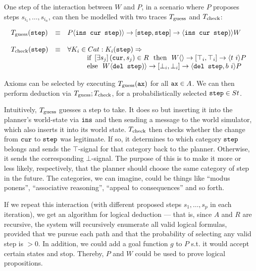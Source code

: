 One step of the interaction between $W$ and $P$, in a scenario where $P$ proposes steps $s_{i_1},\dots,s_{i_n}$, can then be modelled with two traces $T_{\mt{guess}}$ and $T_{\mt{check}}$:

$$
	\begin{array}{l l l}
		T_{\mt{guess}}(\tt{step}) & \equiv & \sendsf{P}{\tt{ins cur step})}{\tt{step}}{\tt{step}}{\tt{ins cur step})}{W}\\
		\\
		T_{\mt{check}}(\tt{step}) & \equiv &
		\forall K_i \in Cat: K_i(\tt{step}) \Rightarrow\\
		
		& & \hspace{1cm} \mt{if } \exQ{s_j} (\field{cur}, s_j) \in R\ \mt{ then } \
					\sendsf{W}{}{\top_i}{\top_i}{t\ i}{P}\\
		& & \hspace{1cm} \mt{else }\ \sendsf{W}{\tt{del step})}{\bot_i}{\bot_i}{\tt{del step}, b\ i}{P}\\
	\end{array}
$$

\medskip

Axioms can be selected by executing $T_{\mt{guess}}(\tt{ax})$ for all $\tt{ax} \in A$. We can then perform deduction via $T_{\mt{guess}};T_{\mt{check}}$, for a probabilistically selected $\tt{step} \in St$.

Intuitively, $T_{\mt{guess}}$ guesses a step to take. It does so but inserting it into the planner's world-state via $\tt{ins}$ and then sending a message to the world simulator, which also inserts it into its world state. $T_{\mt{check}}$ then checks whether the change from $\tt{cur}$ to $\tt{step}$ was legitimate. If so, it determines to which category $\tt{step}$ belongs and sends the $\top$-signal for that category back to the planner. Otherwise, it sends the corresponding $\bot$-signal. The purpose of this is to make it more or less likely, respectively, that the planner should choose the same category of step in the future. The categories, we can imagine, could be things like ``modus ponens'', ``associative reasoning'', ``appeal to consequences'' and so forth.

If we repeat this interaction (with different proposed steps $s_1,\dots,s_p$ in each iteration), we get an algorithm for logical deduction  --- that is, since $A$ and $R$ are recursive, the system will recursively enumerate all valid logical formulas, provided that we pursue each path and that the probability of selecting any valid step is $> 0$. In addition, we could add a goal function $g$ to $P$ s.t. it would accept certain states and stop. Thereby, $P$ and $W$ could be used to prove logical propositions.

